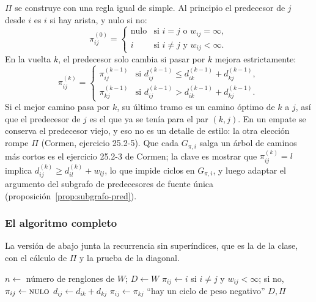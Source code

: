 \documentclass[11pt,letterpaper]{article}
\begin{document}
$\Pi$ se construye con una regla igual de simple. Al principio el
predecesor de $j$ desde $i$ es $i$ si hay arista, y nulo si no:
\[
  \pi^{(0)}_{ij} = \begin{cases}
    \text{nulo} & \text{si } i = j \text{ o } w_{ij} = \infty, \\
    i & \text{si } i \neq j \text{ y } w_{ij} < \infty .
  \end{cases}
\]
En la vuelta $k$, el predecesor solo cambia si pasar por $k$ mejora
estrictamente:
\[
  \pi^{(k)}_{ij} = \begin{cases}
    \pi^{(k-1)}_{ij} & \text{si } d^{(k-1)}_{ij} \le
                       d^{(k-1)}_{ik} + d^{(k-1)}_{kj}, \\
    \pi^{(k-1)}_{kj} & \text{si } d^{(k-1)}_{ij} >
                       d^{(k-1)}_{ik} + d^{(k-1)}_{kj}.
  \end{cases}
\]
Si el mejor camino pasa por $k$, su último tramo es un camino óptimo
de $k$ a $j$, así que el predecesor de $j$ es el que ya se tenía para
el par $(k, j)$. En un empate se conserva el predecesor viejo, y eso
no es un detalle de estilo: la otra elección rompe $\Pi$
(Cormen, ejercicio 25.2-5). Que cada $G_{\pi,i}$ salga un
árbol de caminos más cortos es el ejercicio 25.2-3 de Cormen; la clave
es mostrar que $\pi^{(k)}_{ij} = l$ implica
$d^{(k)}_{ij} \ge d^{(k)}_{il} + w_{lj}$, lo que impide ciclos en
$G_{\pi,i}$, y luego adaptar el argumento del subgrafo de
predecesores de fuente única
(proposición~\ref{prop:subgrafo-pred}).

\subsubsection*{El algoritmo completo}

La versión de abajo junta la recurrencia sin superíndices, que es la
de la clase, con el cálculo de $\Pi$ y la prueba de la diagonal.

\begin{algorithm}[H]
\caption{\textsc{Floyd-Warshall}$(W)$, con $\Pi$ y en el lugar}
\label{alg:floyd-warshall}
\begin{algorithmic}[1]
  \State $n \gets$ número de renglones de $W$; \quad $D \gets W$
      \State $\pi_{ij} \gets i$ si $i \neq j$ y $w_{ij} < \infty$; si
             no, $\pi_{ij} \gets \textsc{nulo}$
    \EndFor
  \EndFor
   
          \State $d_{ij} \gets d_{ik} + d_{kj}$
          \State $\pi_{ij} \gets \pi_{kj}$
        \EndIf
      \EndFor
    \EndFor
  \EndFor
      \State \Return ``hay un ciclo de peso negativo''
    \EndIf
  \EndFor
  \State \Return $D, \Pi$
\EndProcedure
\end{algorithmic}
\end{algorithm}
\end{document}
